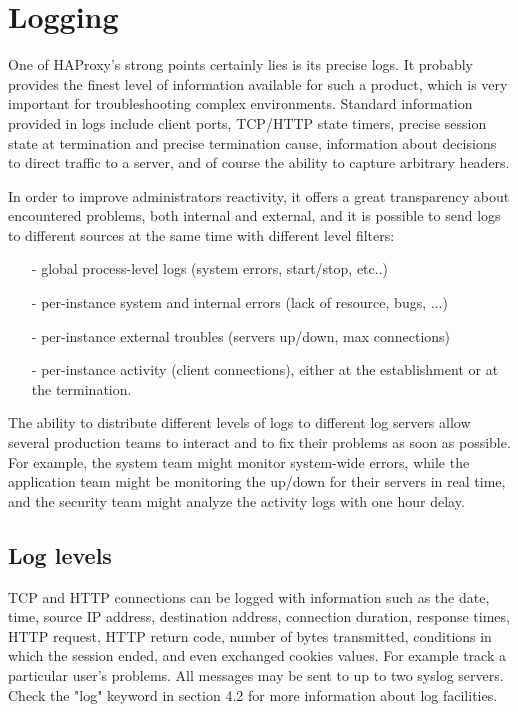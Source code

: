 \chapter{Logging}
\label{chap:logging}

One of HAProxy's strong points certainly lies is its precise logs. It probably
provides the finest level of information available for such a product, which is
very important for troubleshooting complex environments. Standard information
provided in logs include client ports, TCP/HTTP state timers, precise session
state at termination and precise termination cause, information about decisions
to direct traffic to a server, and of course the ability to capture arbitrary
headers.

In order to improve administrators reactivity, it offers a great transparency
about encountered problems, both internal and external, and it is possible to
send logs to different sources at the same time with different level filters:

\begin{itemize}
\item[-] global process-level logs (system errors, start/stop, etc..)
\item[-] per-instance system and internal errors (lack of resource, bugs, ...)
\item[-] per-instance external troubles (servers up/down, max connections)
\item[-] per-instance activity (client connections), either at the establishment or
    at the termination.
\end{itemize}

The ability to distribute different levels of logs to different log servers
allow several production teams to interact and to fix their problems as soon
as possible. For example, the system team might monitor system-wide errors,
while the application team might be monitoring the up/down for their servers in
real time, and the security team might analyze the activity logs with one hour
delay.

\section{Log levels}
\label{sec:log_levels}

TCP and HTTP connections can be logged with information such as the date, time,
source IP address, destination address, connection duration, response times,
HTTP request, HTTP return code, number of bytes transmitted, conditions
in which the session ended, and even exchanged cookies values. For example
track a particular user's problems. All messages may be sent to up to two
syslog servers. Check the "log" keyword in section 4.2 for more information
about log facilities.

